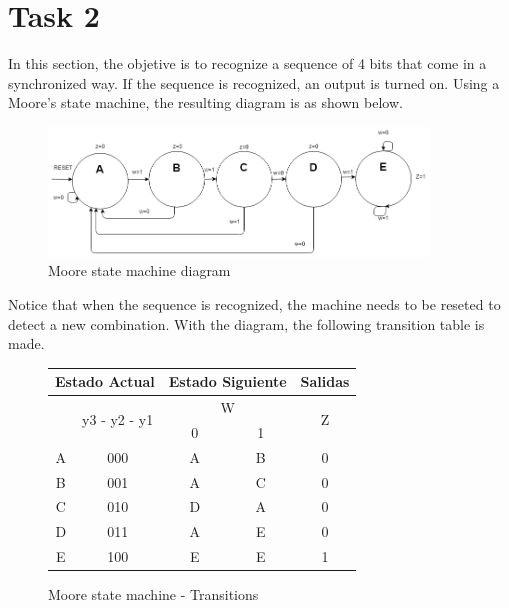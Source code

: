 \newpage

\section*{Task 2}

In this section, the objetive is to recognize a 
sequence of 4 bits that come in a synchronized
way. If the sequence is recognized, an output 
is turned on. Using a Moore's state machine,
the resulting diagram is as shown below.

\begin{figure}[H]
    \begin{centering}
    \includegraphics[width=0.9\textwidth]{data/Graficos2/2a_fsm.png}
    \par\end{centering}
    \caption{Moore state machine diagram}
\end{figure}

Notice that when the sequence is recognized, 
the machine needs to be reseted to detect a 
new combination. With the diagram, the following transition table 
is made.

\begin{figure}[H]
    \begin{centering}
\begin{tabular}{|c|c|c|c||c|}
    \hline 
    \multicolumn{2}{|c|}{Estado Actual} & \multicolumn{2}{c||}{Estado Siguiente} & \multicolumn{1}{c|}{Salidas}\tabularnewline
    \hline 
    \hline 
    \multirow{2}{*}{} & \multirow{2}{*}{y3 - y2 - y1} & \multicolumn{2}{c||}{W} & \multirow{2}{*}{Z}\tabularnewline
    \cline{3-4} 
     &  & \multicolumn{1}{c|}{0} & \multicolumn{1}{c||}{1} & \tabularnewline
    \hline 
    A & 000 & A & B & 0\tabularnewline
    \hline 
    B & 001 & A & C & 0\tabularnewline
    \hline 
    C & 010 & D & A & 0\tabularnewline
    \hline 
    D & 011 & A & E & 0\tabularnewline
    \hline 
    E & 100 & E & E & 1\tabularnewline
    \hline 
    \end{tabular}
    \caption{Moore state machine - Transitions}
\end{centering}
\end{figure}

